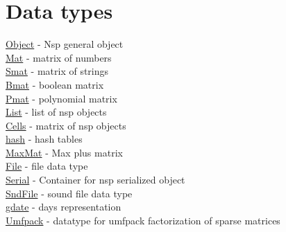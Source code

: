 \chapter*{Data types}


\hyperlink{Object}{Object} - Nsp general object  \\
\hyperlink{Mat}{Mat} - matrix of numbers \\
\hyperlink{Smat}{Smat} - matrix of strings  \\
\hyperlink{Bmat}{Bmat} - boolean matrix  \\
\hyperlink{Pmat}{Pmat} - polynomial matrix  \\
\hyperlink{list}{List} - list  of nsp objects  \\
\hyperlink{Cells}{Cells} - matrix of nsp objects  \\
\hyperlink{hash}{hash} - hash tables  \\
\hyperlink{MaxMat}{MaxMat} - Max plus matrix  \\
\hyperlink{File}{File} - file data type  \\
\hyperlink{Serial}{Serial} - Container for nsp serialized object \\
\hyperlink{SndFile}{SndFile} - sound file data type \\
\hyperlink{gdate}{gdate} - days representation \\
\hyperlink{Umfpack}{Umfpack} - datatype for umfpack factorization of sparse matrices \\



 
 
 
 
 
 
 
 
 
 
 
 
 
 

